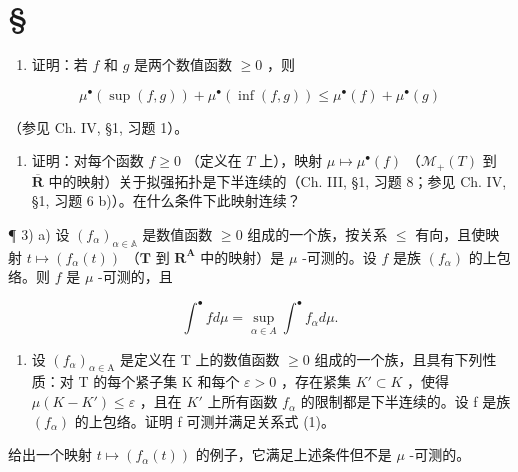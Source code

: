 \section*{\texorpdfstring{\S\CurrentExerciseGroup}{第{\CurrentExerciseGroup}节}}
{}

\begin{enumerate}
\def\labelenumi{\arabic{enumi})}
\tightlist
\item
  证明：若 \(f\) 和 \(g\) 是两个数值函数 \(\geqslant 0\) ，则
\end{enumerate}

\[
\mu^ {\bullet} (\sup (f, g)) + \mu^ {\bullet} (\inf (f, g)) \leqslant \mu^ {\bullet} (f) + \mu^ {\bullet} (g)
\]

（参见 Ch. IV, §1, 习题 1）。

\begin{enumerate}
\def\labelenumi{\arabic{enumi})}
\setcounter{enumi}{1}
\tightlist
\item
  证明：对每个函数 \(f \geqslant 0\) （定义在 \(T\) 上），映射 \(\mu \mapsto \mu^{\bullet}(f)\) （\(\mathcal{M}_{+}(T)\) 到 \(\overline{\mathbf{R}}\) 中的映射）关于拟强拓扑是下半连续的（Ch. III, §1, 习题 8；参见 Ch. IV, §1, 习题 6 b)）。在什么条件下此映射连续？
\end{enumerate}

¶ 3) a) 设 \((f_{\alpha})_{\alpha \in \mathbb{A}}\) 是数值函数 \(\geqslant 0\) 组成的一个族，按关系 \(\leqslant\) 有向，且使映射 \(t \mapsto (f_{\alpha}(t))\) （\(\mathbf{T}\) 到 \(\mathbf{R}^{\mathbf{A}}\) 中的映射）是 \(\mu\) -可测的。设 \(f\) 是族 \((f_{\alpha})\) 的上包络。则 \(f\) 是 \(\mu\) -可测的，且

\[
\int^ {\bullet} f d \mu = \sup _ {\alpha \in A} \int^ {\bullet} f _ {\alpha} d \mu .\tag{1}
\]

\begin{enumerate}
\def\labelenumi{\alph{enumi})}
\setcounter{enumi}{1}
\tightlist
\item
  设 \((f_{\alpha})_{\alpha\in\mathrm{A}}\) 是定义在 T 上的数值函数 \(\geqslant0\) 组成的一个族，且具有下列性质：对 T 的每个紧子集 K 和每个 \(\varepsilon>0\) ，存在紧集 \(K'\subset K\) ，使得 \(\mu(K-K')\leqslant\varepsilon\) ，且在 \(K'\) 上所有函数 \(f_{\alpha}\) 的限制都是下半连续的。设 f 是族 \((f_{\alpha})\) 的上包络。证明 f 可测并满足关系式 (1)。
\end{enumerate}

给出一个映射 \(t \mapsto (f_{\alpha}(t))\) 的例子，它满足上述条件但不是 \(\mu\) -可测的。

